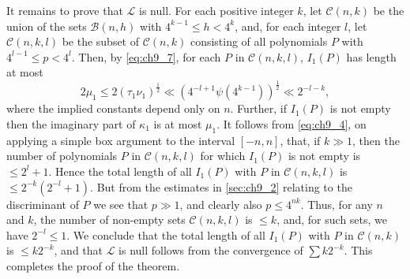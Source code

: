 It remains to prove that $\mathscr{L}$ is null. For each positive integer $k$, let $\mathscr{C}(n,k)$ be the union of the sets $\mathscr{B}(n,h)$ with $4^{k-1} \leq h < 4^k$, and, for each integer $l$, let $\mathscr{C}(n,k,l)$ be the subset of $\mathscr{C}(n,k)$ consisting of all polynomials $P$ with $4^{l-1} \leq p < 4^l$. Then, by \eqref{eq:ch9_7}, for each $P$ in $\mathscr{C}(n,k,l)$, $I_1(P)$ has length at most
\[2\mu_1 \leq 2(\tau_1 \nu_1)^{\frac{1}{2}} \ll (4^{-l+1}\psi(4^{k-1}))^{\frac{1}{2}} \ll 2^{-l-k},\]
where the implied constants depend only on $n$. Further, if $I_1(P)$ is not empty then the imaginary part of $\kappa_1$ is at most $\mu_1$. It follows from \eqref{eq:ch9_4}, on applying a simple box argument to the interval $[-n,n]$, that, if $k \gg 1$, then the number of polynomials $P$ in $\mathscr{C}(n,k,l)$ for which $I_1(P)$ is not empty is $\leqslant 2^l+1$. Hence the total length of all $I_1(P)$ with $P$ in $\mathscr{C}(n,k,l)$ is $\leqslant 2^{-k}(2^{-l}+1)$. But from the estimates in \autoref{sec:ch9_2} relating to the discriminant of $P$ we see that $p \gg 1$, and clearly also $p \leqslant 4^{nk}$. Thus, for any $n$ and $k$, the number of non-empty sets $\mathscr{C}(n,k,l)$ is $\leqslant k$, and, for such sets, we have $2^{-l} \leqslant 1$. We conclude that the total length of all $I_1(P)$ with $P$ in $\mathscr{C}(n,k)$ is $\leqslant k2^{-k}$, and that $\mathscr{L}$ is null follows from the convergence of $\sum k2^{-k}$. This completes the proof of the theorem.